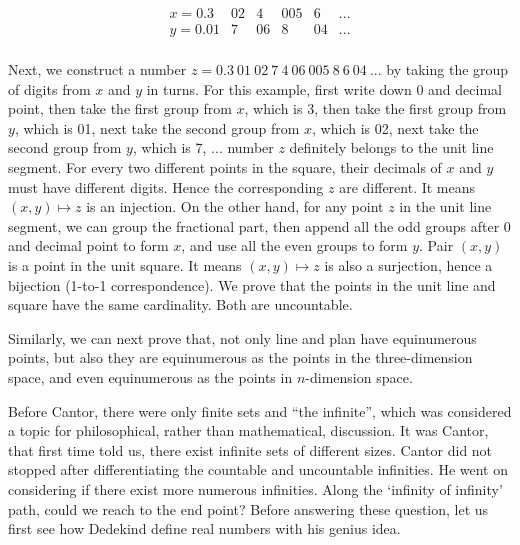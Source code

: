 \documentclass{article}
\begin{document}
\[
\begin{array}{lcccccc}
x = 0.3 & 02 & 4 & 005 & 6 & ... \\
y = 0.01 & 7 & 06 & 8 & 04 & ... \\
\end{array}
\]

Next, we construct a number $z = 0.3\ 01\ 02\ 7\ 4\ 06\ 005\ 8\ 6\ 04\ ...$ by taking the group of digits from $x$ and $y$ in turns. For this example, first write down 0 and decimal point, then take the first group from $x$, which is 3, then take the first group from $y$, which is 01, next take the second group from $x$, which is 02, next take the second group from $y$, which is 7, ... number $z$ definitely belongs to the unit line segment. For every two different points in the square, their decimals of $x$ and $y$ must have different digits. Hence the corresponding $z$ are different. It means $(x, y) \mapsto z$ is an injection. On the other hand, for any point $z$ in the unit line segment, we can group the fractional part, then append all the odd groups after 0 and decimal point to form $x$, and use all the even groups to form $y$. Pair $(x, y)$ is a point in the unit square. It means $(x, y) \mapsto z$ is also a surjection, hence a bijection (1-to-1 correspondence). We prove that the points in the unit line and square have the same cardinality. Both are uncountable.

Similarly, we can next prove that, not only line and plan have equinumerous points, but also they are equinumerous as the points in the three-dimension space, and even equinumerous as the points in $n$-dimension space.

Before Cantor, there were only finite sets and ``the infinite'', which was considered a topic for philosophical, rather than mathematical, discussion. It was Cantor, that first time told us, there exist infinite sets of different sizes. Cantor did not stopped after differentiating the countable and uncountable infinities. He went on considering if there exist more numerous infinities. Along the `infinity of infinity' path, could we reach to the end point? Before answering these question, let us first see how Dedekind define real numbers with his genius idea.

\begin{Exercise}
\end{Exercise}
\end{document}
